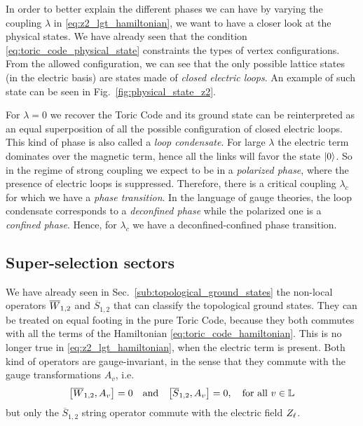 In order to better explain the different phases we can have by varying the coupling $\lambda$ in \eqref{eq:z2_lgt_hamiltonian}, we want to have a closer look at the physical states.
We have already seen that the condition \eqref{eq:toric_code_physical_state} constraints the types of vertex configurations.
From the allowed configuration, we can see that the only possible lattice states (in the electric basis) are states made of \emph{closed electric loops}.
An example of such state can be seen in Fig.~\ref{fig:physical_state_z2}.


For $\lambda = 0$ we recover the Toric Code and its ground state can be reinterpreted as an equal superposition of all the possible configuration of closed electric loops.
This kind of phase is also called a \emph{loop condensate}.
For large $\lambda$ the electric term dominates over the magnetic term, hence all the links will favor the state $\ket{0}$.
So in the regime of strong coupling we expect to be in a \emph{polarized phase}, where the presence of electric loops is suppressed.
Therefore, there is a critical coupling $\lambda_c$ for which we have a \emph{phase transition}.
In the language of gauge theories, the loop condensate corresponds to a \emph{deconfined phase} while the polarized one is a \emph{confined phase}.
Hence, for $\lambda_c$ we have a deconfined-confined phase transition.

\begin{figure}[t]
\end{figure}



\subsection{Super-selection sectors}
\label{sub:super_selection_sectors}

We have already seen in Sec.~\ref{sub:topological_ground_states} the non-local operators $\overline{W}_{1,2}$ and $\overline{S}_{1,2}$ that can classify the topological ground states.
They can be treated on equal footing in the pure Toric Code, because they both commutes with all the terms of the Hamiltonian \eqref{eq:toric_code_hamiltonian}.
This is no longer true in \eqref{eq:z2_lgt_hamiltonian}, when the electric term is present.
Both kind of operators are gauge-invariant, in the sense that they commute with the gauge transformations $A_v$, i.e.
\begin{equation}
    \comm{\Wilson_{1,2}}{A_v} = 0
    \qand
    \comm{\overline{S}_{1,2}}{A_v} = 0,
    \quad \text{for all $v \in \lattice$}
\end{equation}
but only the $\overline{S}_{1,2}$ string operator commute with the electric field $Z_{\ell}$.

